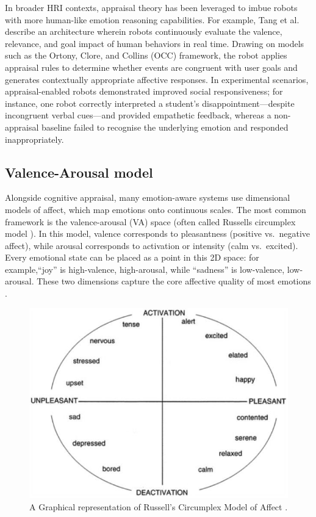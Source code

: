 In broader HRI contexts, appraisal theory has been leveraged to imbue robots with more human-like emotion reasoning capabilities. For example, Tang et al.\ \cite{Tang2025-ny} describe an architecture wherein robots continuously evaluate the valence, relevance, and goal impact of human behaviors in real time. Drawing on models such as the Ortony, Clore, and Collins (OCC) framework, the robot applies appraisal rules to determine whether events are congruent with user goals and generates contextually appropriate affective responses. In experimental scenarios, appraisal-enabled robots demonstrated improved social responsiveness; for instance, one robot correctly interpreted a student's disappointment—despite incongruent verbal cues—and provided empathetic feedback, whereas a non-appraisal baseline failed to recognise the underlying emotion and responded inappropriately.

\subsection{Valence-Arousal model}

Alongside cognitive appraisal, many emotion-aware systems use dimensional models of affect, which map emotions onto continuous scales. The most common framework is the valence-arousal (VA) space (often called Russells circumplex model \cite{Russell1980-cd}). In this model, valence corresponds to pleasantness (positive vs.\ negative affect), while arousal corresponds to activation or intensity (calm vs.\ excited). Every emotional state can be placed as a point in this 2D space: for example,``joy'' is high-valence, high-arousal, while ``sadness'' is low-valence, low-arousal. These two dimensions capture the core affective quality of most emotions \cite{Marmpena2018-tw}.

\begin{figure}[!htb]
    \centering{}
    \includegraphics[scale=0.15]{lit_review_images/RussellsCircumplex.jpg}
    \caption{A Graphical representation of Russell's Circumplex Model of Affect \cite{Russell1980-cd}.}
    \label{fig:RussellsCircumplex}
\end{figure}

